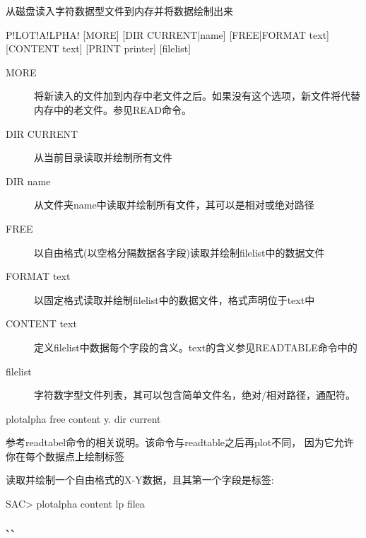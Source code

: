 \label{cmd:plotalpha}

从磁盘读入字符数据型文件到内存并将数据绘制出来

\begin{SACSTX}
P!LOT!A!LPHA! [MORE] [DIR CURRENT|name] [FREE|FORMAT text] [CONTENT text]
    [PRINT printer] [filelist]
\end{SACSTX}

\begin{description}
\item [MORE] 将新读入的文件加到内存中老文件之后。如果没有这个选项，新文件将代替内存中的老文件。参见READ命令。
\item [DIR CURRENT] 从当前目录读取并绘制所有文件
\item [DIR name] 从文件夹name中读取并绘制所有文件，其可以是相对或绝对路径
\item [FREE] 以自由格式(以空格分隔数据各字段)读取并绘制filelist中的数据文件
\item [FORMAT text] 以固定格式读取并绘制filelist中的数据文件，格式声明位于text中
\item [CONTENT text] 定义filelist中数据每个字段的含义。text的含义参见READTABLE命令中的
\item [filelist] 字符数字型文件列表，其可以包含简单文件名，绝对/相对路径，通配符。
\end{description}

\begin{SACDFT}
plotalpha free content y. dir current
\end{SACDFT}

参考readtabel命令的相关说明。该命令与readtable之后再plot不同，
因为它允许你在每个数据点上绘制标签

读取并绘制一个自由格式的X-Y数据，且其第一个字段是标签:
\begin{SACCode}
SAC> plotalpha content lp filea
\end{SACCode}

、、
